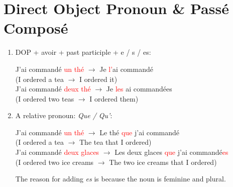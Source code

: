 \documentclass{book}
\begin{document}
    \section{Direct Object Pronoun \& Passé Composé}
        \begin{enumerate}
            \item DOP + avoir + past participle + e / s / es:
                \begin{center}
                    J'ai commandé \textcolor{red}{un thé} $\to$ Je \textcolor{red}{l'}ai commandé \\
                    (I ordered a tea $\to$ I ordered it) \\
                    J'ai commandé \textcolor{red}{deux thé} $\to$ Je \textcolor{red}{les} ai commandées \\
                    (I ordered two teas $\to$ I ordered them)
                \end{center}
            
            \item A relative pronoun: \textit{Que / Qu'}:
                \begin{center}
                    J'ai commandé \textcolor{red}{un thé} $\to$ Le thé \textcolor{red}{que} j'ai commandé \\
                    (I ordered a tea $\to$ The tea that I ordered) \\
                    J'ai commandé \textcolor{red}{deux glaces} $\to$ Les deux glaces \textcolor{red}{que} j'ai commandé\textcolor{red}{es} \\
                    (I ordered two ice creams $\to$ The two ice creams that I ordered)
                \end{center}
                The reason for adding \textit{es} is because the noun is feminine and plural.
        \end{enumerate}
\end{document}
